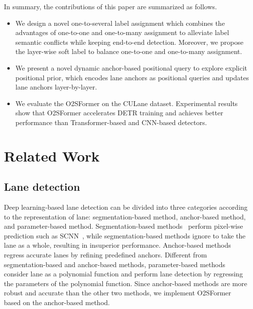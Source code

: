 \documentclass{bmvc2k}
\begin{document}
   In summary, the contributions of this paper are summarized as follows.
   \vspace{-0.12cm}
   \begin{itemize}
      \item We design a novel one-to-several label assignment which combines the advantages of one-to-one and one-to-many assignment
      to alleviate label semantic conflicts while keeping end-to-end detection. Moreover, we propose the layer-wise soft label to balance one-to-one and one-to-many assignment.
      \vspace{-0.12cm}
      \item We present a novel dynamic anchor-based positional query to explore explicit positional prior, which encodes lane anchors as positional queries and updates lane anchors layer-by-layer.
      \vspace{-0.12cm}
      \item We evaluate the O2SFormer on the CULane dataset. Experimental results show that O2SFormer accelerates DETR training and achieves better performance than Transformer-based and CNN-based detectors.
      \end{itemize}


\section{Related Work}
\label{sec:Related Work}
\vspace{-0.2cm}
\subsection{Lane detection}
Deep learning-based lane detection can be divided into three categories according to the representation of lane: 
segmentation-based method, anchor-based method, and parameter-based method. Segmentation-based methods~\cite{pan2018spatial,zheng2021resa,yang2023lane} 
perform pixel-wise prediction such as SCNN~\cite{pan2018spatial}, while segmentation-based methods ignore to take the lane 
as a whole, resulting in insuperior performance. Anchor-based methods~\cite{li2019line,tabelini2021keep,zheng2022clrnet} regress accurate lanes 
by refining predefined anchors. Different from segmentation-based and anchor-based methods, 
parameter-based methods~\cite{tabelini2021polylanenet,liu2021end} consider lane as a polynomial function and perform lane 
detection by regressing the parameters of the polynomial function. Since anchor-based methods 
are more robust and accurate than the other two methods, 
we implement O2SFormer based on the anchor-based method.
\vspace{-0.31cm}
\end{document}
